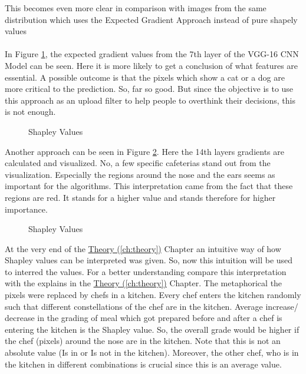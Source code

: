 This becomes even more clear in comparison with images from the same distribution which uses the Expected Gradient Approach instead of pure shapely values\\\\

In Figure \ref{fig:expected_gradients_7}, the expected gradient values from the 7th layer of the VGG-16 CNN Model can be seen. Here it is more likely to get a conclusion of what features are essential. A possible outcome is that the pixels which show a cat or a dog are more critical to the prediction. So, far so good. But since the objective is to use this approach as an upload filter to help people to overthink their decisions, this is not enough.\\

\begin{figure}[htp]
	\centering
	\caption{Shapley Values }
	\label{fig:expected_gradients_7}
\end{figure}

Another approach can be seen in Figure \ref{fig:expected_gradients_14}. Here the 14th layers gradients are calculated and visualized. No, a few specific cafeterias stand out from the visualization. Especially the regions around the nose and the ears seems as important for the algorithms. This interpretation came from the fact that these regions are red. It stands for a higher value and stands therefore for higher importance. 

\begin{figure}[htp]
	\centering
	\caption{Shapley Values }
	\label{fig:expected_gradients_14}
\end{figure}

At the very end of the \hyperref[ch:theory]{Theory (\ref{ch:theory})} Chapter an intuitive way of how Shapley values can be interpreted was given. So, now this intuition will be used to interred the values. For a better understanding compare this interpretation with the explains in the  \hyperref[ch:theory]{Theory (\ref{ch:theory})} Chapter. The metaphorical the pixels were replaced by chefs in a kitchen. Every chef enters the kitchen randomly such that different constellations of the chef are in the kitchen. Average increase/ decrease in the grading of meal which got prepared before and after a chef is entering the kitchen is the Shapley value. So, the overall grade would be higher if the chef (pixels) around the nose are in the kitchen. Note that this is not an absolute value (Is in or Is not in the kitchen). Moreover, the other chef, who is in the kitchen in different combinations is crucial since this is an average value. 